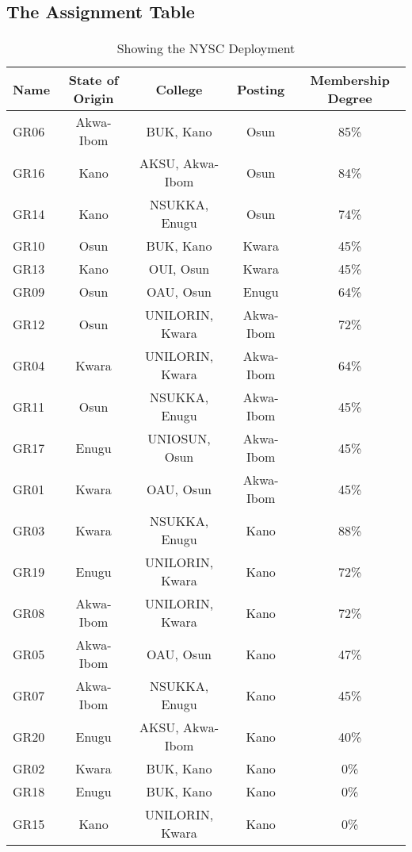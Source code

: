 \documentclass[a4paper]{book}
\begin{document}
				\subsection{The Assignment Table}
					\paragraph{}
						\begin{table}[!th]
							\begin{tabular}{|l|c|c|c|c|}
							\hline
							\textbf{Name} & \textbf{State of Origin} & \textbf{College} & \textbf{Posting} & \textbf{Membership Degree} \\
							\hline
							GR06 & Akwa-Ibom & BUK, Kano & Osun & 85\% \\
							\hline
							GR16 & Kano & AKSU, Akwa-Ibom & Osun & 84\% \\
							\hline
							GR14 & Kano & NSUKKA, Enugu & Osun & 74\% \\
							\hline
							GR10 & Osun & BUK, Kano & Kwara & 45\% \\
							\hline
							GR13 & Kano & OUI, Osun & Kwara & 45\% \\
							\hline
							GR09 & Osun & OAU, Osun & Enugu & 64\% \\
							\hline
							GR12 & Osun & UNILORIN, Kwara & Akwa-Ibom & 72\% \\
							\hline
							GR04 & Kwara & UNILORIN, Kwara & Akwa-Ibom & 64\% \\
							\hline
							GR11 & Osun & NSUKKA, Enugu & Akwa-Ibom & 45\% \\
							\hline
							GR17 & Enugu & UNIOSUN, Osun & Akwa-Ibom & 45\% \\
							\hline
							GR01 & Kwara & OAU, Osun & Akwa-Ibom & 45\% \\
							\hline
							GR03 & Kwara & NSUKKA, Enugu & Kano & 88\% \\
							\hline
							GR19 & Enugu & UNILORIN, Kwara & Kano & 72\% \\
							\hline
							GR08 & Akwa-Ibom & UNILORIN, Kwara & Kano & 72\% \\
							\hline
							GR05 & Akwa-Ibom & OAU, Osun & Kano & 47\% \\
							\hline
							GR07 & Akwa-Ibom & NSUKKA, Enugu & Kano & 45\% \\
							\hline
							GR20 & Enugu & AKSU, Akwa-Ibom & Kano & 40\% \\
							\hline
							GR02 & Kwara & BUK, Kano & Kano & 0\% \\
							\hline
							GR18 & Enugu & BUK, Kano & Kano & 0\% \\
							\hline
							GR15 & Kano & UNILORIN, Kwara & Kano & 0\% \\
							\hline
							\end{tabular}
							\caption{Showing the NYSC Deployment}
							\label{ex:table}
						\end{table}
\end{document}
